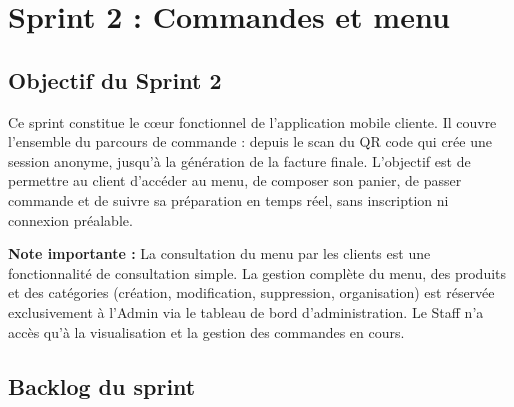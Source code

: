 \newpage
\section{Sprint 2 : Commandes et menu}

\subsection{Objectif du Sprint 2}

Ce sprint constitue le cœur fonctionnel de l'application mobile cliente. Il couvre l'ensemble du parcours de commande : depuis le scan du QR code qui crée une session anonyme, jusqu'à la génération de la facture finale. L'objectif est de permettre au client d'accéder au menu, de composer son panier, de passer commande et de suivre sa préparation en temps réel, sans inscription ni connexion préalable.

\textbf{Note importante :} La consultation du menu par les clients est une fonctionnalité de consultation simple. La gestion complète du menu, des produits et des catégories (création, modification, suppression, organisation) est réservée exclusivement à l'Admin via le tableau de bord d'administration. Le Staff n'a accès qu'à la visualisation et la gestion des commandes en cours.

\subsection{Backlog du sprint}

